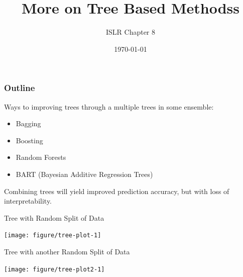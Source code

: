 \documentclass[]{beamer}\usepackage[]{graphicx}\usepackage[]{color}
\title{More on Tree Based Methodss}
\author{ISLR Chapter 8 }
\date{\today}
\newenvironment{knitrout}{}{} %
\begin{document}
\maketitle




\begin{frame}\frametitle{Outline}
Ways to improving trees through a multiple trees in some ensemble:
  \begin{itemize}
  \item Bagging  \pause
  \item Boosting \pause
  \item Random Forests  \pause
  \item BART  (Bayesian Additive Regression Trees) \pause
  \end{itemize}
Combining trees will yield improved prediction accuracy, but with loss of interpretability.
\end{frame}




\begin{frame}[fragile]{Tree with Random Split of Data}



\vspace{-.25in}
\begin{knitrout}
\color{fgcolor}

{\centering \texttt{[image: figure/tree-plot-1]} 

}



\end{knitrout}

\end{frame}

\begin{frame}[fragile]{Tree with another Random Split of Data}

\vspace{-.25in}
\begin{knitrout}
\color{fgcolor}

{\centering \texttt{[image: figure/tree-plot2-1]} 

}



\end{knitrout}

\end{frame}
\end{document}
